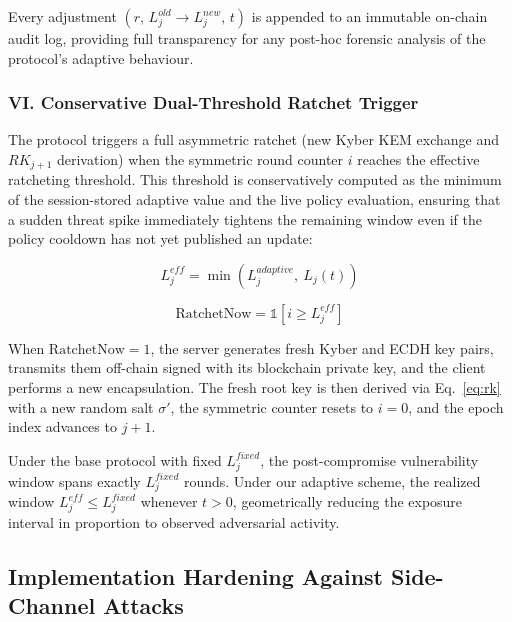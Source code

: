 \documentclass[journal, 10pt, twocolumn]{IEEEtran}
\begin{document}
Every adjustment $(r,\, L_j^{old} \to L_j^{new},\, t)$ is appended to an immutable on-chain audit log, providing full transparency for any post-hoc forensic analysis of the protocol's adaptive behaviour.

\subsubsection{VI. Conservative Dual-Threshold Ratchet Trigger}

The protocol triggers a full asymmetric ratchet (new Kyber KEM exchange and $RK_{j+1}$ derivation) when the symmetric round counter $i$ reaches the effective ratcheting threshold. This threshold is conservatively computed as the minimum of the session-stored adaptive value and the live policy evaluation, ensuring that a sudden threat spike immediately tightens the remaining window even if the policy cooldown has not yet published an update:

\begin{equation}
L_j^{eff} = \min\!\left(L_j^{adaptive},\ L_j(t)\right)
\label{eq:lj_eff}
\end{equation}

\begin{equation}
\text{RatchetNow} = \mathbb{1}\!\left[i \geq L_j^{eff}\right]
\label{eq:trigger}
\end{equation}

When $\text{RatchetNow} = 1$, the server generates fresh Kyber and ECDH key pairs, transmits them off-chain signed with its blockchain private key, and the client performs a new encapsulation. The fresh root key is then derived via Eq.~\eqref{eq:rk} with a new random salt $\sigma'$, the symmetric counter resets to $i = 0$, and the epoch index advances to $j + 1$.

Under the base protocol with fixed $L_j^{fixed}$, the post-compromise vulnerability window spans exactly $L_j^{fixed}$ rounds. Under our adaptive scheme, the realized window $L_j^{eff} \leq L_j^{fixed}$ whenever $t > 0$, geometrically reducing the exposure interval in proportion to observed adversarial activity.

\subsection{Implementation Hardening Against Side-Channel Attacks}
\label{sec:contribution_hardening}
\end{document}
